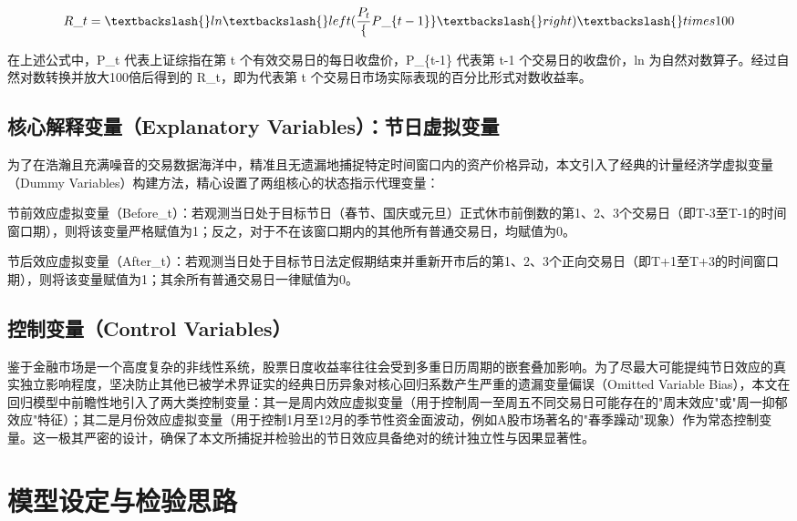\documentclass{cupb-thesis}
\begin{document}
\begin{equation}

R\_t = \textbackslash{}ln\textbackslash{}left(\frac{P_t}\{P\_\{t-1\}\}\textbackslash{}right) \textbackslash{}times 100

\end{equation}


在上述公式中，P\_t 代表上证综指在第 t 个有效交易日的每日收盘价，P\_\{t-1\} 代表第 t-1 个交易日的收盘价，ln 为自然对数算子。经过自然对数转换并放大100倍后得到的 R\_t，即为代表第 t 个交易日市场实际表现的百分比形式对数收益率。


\subsection{核心解释变量（Explanatory Variables）：节日虚拟变量}


为了在浩瀚且充满噪音的交易数据海洋中，精准且无遗漏地捕捉特定时间窗口内的资产价格异动，本文引入了经典的计量经济学虚拟变量（Dummy Variables）构建方法，精心设置了两组核心的状态指示代理变量：


节前效应虚拟变量（Before\_t）：若观测当日处于目标节日（春节、国庆或元旦）正式休市前倒数的第1、2、3个交易日（即T-3至T-1的时间窗口期），则将该变量严格赋值为1；反之，对于不在该窗口期内的其他所有普通交易日，均赋值为0。


节后效应虚拟变量（After\_t）：若观测当日处于目标节日法定假期结束并重新开市后的第1、2、3个正向交易日（即T+1至T+3的时间窗口期），则将该变量赋值为1；其余所有普通交易日一律赋值为0。


\subsection{控制变量（Control Variables）}


鉴于金融市场是一个高度复杂的非线性系统，股票日度收益率往往会受到多重日历周期的嵌套叠加影响。为了尽最大可能提纯节日效应的真实独立影响程度，坚决防止其他已被学术界证实的经典日历异象对核心回归系数产生严重的遗漏变量偏误（Omitted Variable Bias），本文在回归模型中前瞻性地引入了两大类控制变量：其一是周内效应虚拟变量（用于控制周一至周五不同交易日可能存在的"周末效应"或"周一抑郁效应"特征）；其二是月份效应虚拟变量（用于控制1月至12月的季节性资金面波动，例如A股市场著名的"春季躁动"现象）作为常态控制变量。这一极其严密的设计，确保了本文所捕捉并检验出的节日效应具备绝对的统计独立性与因果显著性。


\section{模型设定与检验思路}
\end{document}
